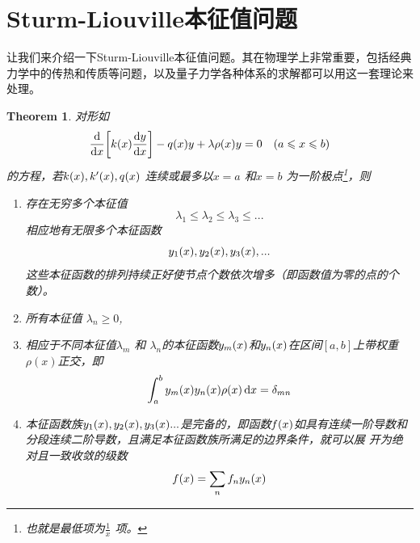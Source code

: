 \documentclass[12pt,a4paper,openany,twoside]{book}
\newtheorem{theorem}{Theorem}[section]
\numberwithin{equation}{section}
\begin{document}
      \section{Sturm-Liouville本征值问题}
        \label{sturm_Liouville_eigenvalue_problem}
        让我们来介绍一下Sturm-Liouville本征值问题。其在物理学上非常重要，包括经典力学中的传热和传质等问题，以及量子力学各种体系的求解都可以用这一套理论来处理。
        \begin{theorem}
          对形如
          \begin{equation}
            \dv{x}\qty[k\qty(x)\dv{y}{x}]-q\qty(x)y +\lambda\rho\qty(x)y=0 \quad (a\leqslant x \leqslant b)
          \end{equation}
          的方程，若$k\qty(x),k'\qty(x),q\qty(x)$ 连续或最多以$x=a$ 和$x=b$ 为一阶极点\footnote{也就是最低项为$\frac{1}{x}$ 项。}，则
          \begin{enumerate}
            \item 存在无穷多个本征值
              \begin{equation*}
                \lambda_1 \leqslant \lambda_2 \leqslant \lambda_3 \leqslant ...
              \end{equation*} 
              相应地有无限多个本征函数
              \begin{equation*}
                y_1\qty(x),y_2\qty(x),y_3\qty(x),...
              \end{equation*}
              这些本征函数的排列持续正好使节点个数依次增多（即函数值为零的点的个数）。
            \item 所有本征值 $\lambda_n \geqslant 0$,
            \item 相应于不同本征值$\lambda_m$ 和 $\lambda_n$的本征函数$y_m\qty(x)$和$y_n\qty(x)$在区间$[a,b]$上带权重$\rho(x)$正交，即
              \begin{equation}
                \int^b_a{y_m\qty(x)y_n\qty(x)\rho\qty(x)\dd{x}}=\delta_{mn} 
              \end{equation}
            \item 本征函数族$y_1\qty(x),y_2\qty(x),y_3\qty(x)...$是完备的，即函数$f\qty(x)$如具有连续一阶导数和分段连续二阶导数，且满足本征函数族所满足的边界条件，就可以展   开为绝对且一致收敛的级数
              \begin{equation*}
                f\qty(x) = \sum_n{f_n y_n\qty(x)}
              \end{equation*}
          \end{enumerate}
        \end{theorem}
\end{document}
